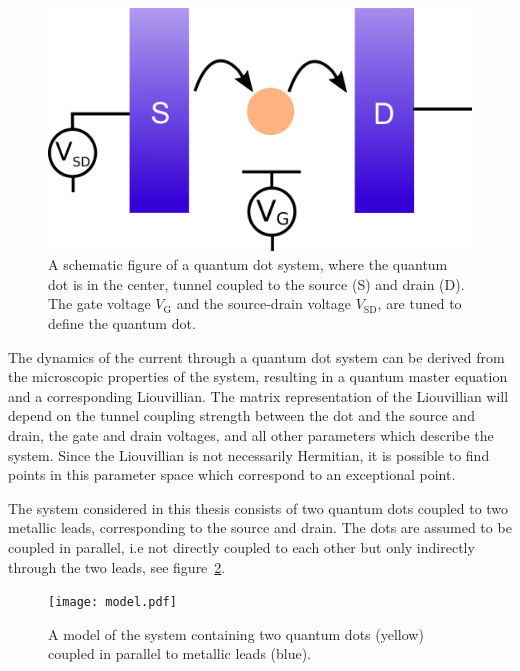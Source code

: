 \documentclass[../main.tex]{subfiles}
\begin{document}
\begin{figure}[H]
    \centering
    \includegraphics[width=\linewidth]{figures/qdotschematic.png}
    \caption{A schematic figure of a quantum dot system, where the quantum dot is in the center, tunnel coupled to the source (S) and drain (D). The gate voltage $V_\text{G}$ and the source-drain voltage $V_\text{SD}$, are tuned to define the quantum dot.}
    \label{fig:qdotscheme}
\end{figure}


The dynamics of the current through a quantum dot system can be derived from the microscopic properties of the system, resulting in a quantum master equation and a corresponding Liouvillian. The matrix representation of the Liouvillian will depend on the tunnel coupling strength between the dot and the source and drain, the gate and drain voltages, and all other parameters which describe the system. Since the Liouvillian is not necessarily Hermitian, it is possible to find points in this parameter space which correspond to an exceptional point.

The system considered in this thesis consists of two quantum dots coupled to two metallic leads, corresponding to the source and drain. The dots are assumed to be coupled in parallel, i.e not directly coupled to each other but only indirectly through the two leads, see figure~\ref{fig:model}. 
\begin{figure}[H]
    \centering
    \texttt{[image: model.pdf]}
    \caption{A model of the system containing two quantum dots (yellow) coupled in parallel to metallic leads (blue).}
    \label{fig:model}
\end{figure}
\end{document}
